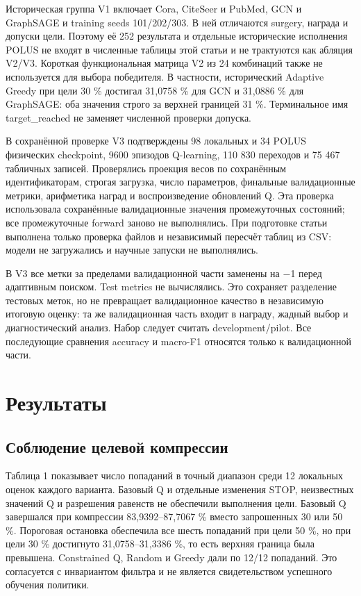 \documentclass[10pt,a4paper]{article}
\begin{document}
Историческая группа V1 включает Cora, CiteSeer и PubMed, GCN и GraphSAGE и training seeds 101/202/303. В ней отличаются surgery, награда и допуски цели. Поэтому её 252 результата и отдельные исторические исполнения POLUS не входят в численные таблицы этой статьи и не трактуются как абляция V2/V3. Короткая функциональная матрица V2 из 24 комбинаций также не используется для выбора победителя. В частности, исторический Adaptive Greedy при цели 30 \% достигал 31,0758 \% для GCN и 31,0886 \% для GraphSAGE: оба значения строго за верхней границей 31 \%. Терминальное имя target\_reached не заменяет численной проверки допуска.

В сохранённой проверке V3 подтверждены 98 локальных и 34 POLUS физических checkpoint, 9600 эпизодов Q-learning, 110 830 переходов и 75 467 табличных записей. Проверялись проекция весов по сохранённым идентификаторам, строгая загрузка, число параметров, финальные валидационные метрики, арифметика наград и воспроизведение обновлений Q. Эта проверка использовала сохранённые валидационные значения промежуточных состояний; все промежуточные forward заново не выполнялись. При подготовке статьи выполнена только проверка файлов и независимый пересчёт таблиц из CSV: модели не загружались и научные запуски не выполнялись.

В V3 все метки за пределами валидационной части заменены на $-$1 перед адаптивным поиском. Test metrics не вычислялись. Это сохраняет разделение тестовых меток, но не превращает валидационное качество в независимую итоговую оценку: та же валидационная часть входит в награду, жадный выбор и диагностический анализ. Набор следует считать development/pilot. Все последующие сравнения accuracy и macro-F1 относятся только к валидационной части.

\section*{Результаты}
\subsection*{Соблюдение целевой компрессии}
Таблица 1 показывает число попаданий в точный диапазон среди 12 локальных оценок каждого варианта. Базовый Q и отдельные изменения STOP, неизвестных значений Q и разрешения равенств не обеспечили выполнения цели. Базовый Q завершался при компрессии 83,9392–87,7067 \% вместо запрошенных 30 или 50 \%. Пороговая остановка обеспечила все шесть попаданий при цели 50 \%, но при цели 30 \% достигнуто 31,0758–31,3386 \%, то есть верхняя граница была превышена. Constrained Q, Random и Greedy дали по 12/12 попаданий. Это согласуется с инвариантом фильтра и не является свидетельством успешного обучения политики.
\end{document}
